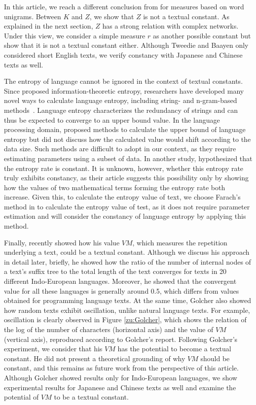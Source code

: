 \documentclass[english]{jnlp_1.4_rep}
\begin{document}
In this article, we reach a different conclusion from for measures based on word unigrams. Between $K$ and $Z$, we show that $Z$ is not a textual constant. As explained in the next section, $Z$ has a strong relation with complex networks. Under this view, we consider a simple measure $r$ as another possible constant but show that it is not a textual constant either. Although Tweedie and Baayen only considered short English texts, we verify constancy with Japanese and Chinese texts as well. 

The entropy of language cannot be ignored in the context of textual constants. Since \cite{Shannon} proposed information-theoretic entropy, researchers have developed many novel ways to calculate language entropy, including string- and n-gram-based methods~\cite{cover}. Language entropy characterizes the redundancy of strings and can thus be expected to converge to an upper bound value. In the language processing domain, \cite{brown} proposed methods to calculate the upper bound of language entropy but did not discuss how the calculated value would shift according to the data size. Such methods are difficult to adopt in our context, as they require estimating parameters using a subset of data. In another study, \cite{genzel} hypothesized that the entropy rate is constant. It is unknown, however, whether this entropy rate truly exhibits constancy, as their article suggests this possibility only by showing how the values of two mathematical terms forming the entropy rate both increase. Given this, to calculate the entropy value of text, we choose Farach's method in \cite{Farach} to calculate the entropy value of test, as it does not require parameter estimation and will consider the constancy of language entropy by applying this method.

Finally, \cite{Golcher} recently showed how his value $\mathit{VM}$, which measures the repetition underlying a text, could be a textual constant. Although we discuss his approach in detail later, briefly, he showed how the ratio of the number of internal nodes of a text's suffix tree to the total length of the text converges for texts in 20 different Indo-European languages. Moreover, he showed that the convergent value for all these languages is generally around 0.5, which differs from values obtained for programming language texts. At the same time, Golcher also showed how random texts exhibit oscillation, unlike natural language texts. For example, oscillation is clearly observed in Figure \ref{zu:Golcher}, which shows the relation of the log of the number of characters (horizontal axis) and the value of $\mathit{VM}$ (vertical axis), reproduced according to Golcher's report. Following Golcher's experiment, we consider that his $\mathit{VM}$ has the potential to become a textual  constant. He did not present a theoretical grounding of why $\mathit{VM}$ should be constant, and this remains as future work from the perspective of this article. Although Golcher showed results only for Indo-European languages, we show experimental results for Japanese and Chinese texts as well and examine the potential of $\mathit{VM}$ to be a textual constant.
\end{document}
